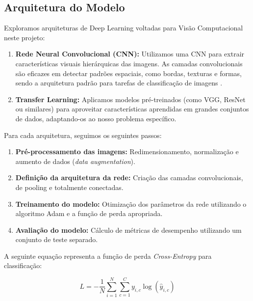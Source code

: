 \documentclass{article}
\begin{document}
\subsection{Arquitetura do Modelo}
Exploramos arquiteturas de Deep Learning voltadas para Vis\~ao Computacional neste projeto:

\begin{enumerate}
    \item \textbf{Rede Neural Convolucional (CNN):} Utilizamos uma CNN para extrair caracter\'isticas visuais hier\'arquicas das imagens. As camadas convolucionais s\~ao eficazes em detectar padr\~oes espaciais, como bordas, texturas e formas, sendo a arquitetura padr\~ao para tarefas de classifica\c{c}\~ao de imagens \cite{lecun2015deep}.
        \item \textbf{Transfer Learning:} Aplicamos modelos pr\'e-treinados (como VGG, ResNet ou similares) para aproveitar caracter\'isticas aprendidas em grandes conjuntos de dados, adaptando-os ao nosso problema espec\'ifico.
        \end{enumerate}

        Para cada arquitetura, seguimos os seguintes passos:

        \begin{enumerate}[label=\alph*)]
            \item \textbf{Pr\'e-processamento das imagens:} Redimensionamento, normaliza\c{c}\~ao e aumento de dados (\textit{data augmentation}).
                \item \textbf{Defini\c{c}\~ao da arquitetura da rede:} Cria\c{c}\~ao das camadas convolucionais, de pooling e totalmente conectadas.
                    \item \textbf{Treinamento do modelo:} Otimiza\c{c}\~ao dos par\^ametros da rede utilizando o algoritmo Adam e a fun\c{c}\~ao de perda apropriada.
                        \item \textbf{Avalia\c{c}\~ao do modelo:} C\'alculo de m\'etricas de desempenho utilizando um conjunto de teste separado.
                        \end{enumerate}

                        A seguinte equa\c{c}\~ao representa a fun\c{c}\~ao de perda \textit{Cross-Entropy} para classifica\c{c}\~ao:

                        \begin{equation}
                        L = -\frac{1}{N} \sum_{i=1}^{N} \sum_{c=1}^{C} y_{i,c} \log(\hat{y}_{i,c})
                        \end{equation}
\end{document}
